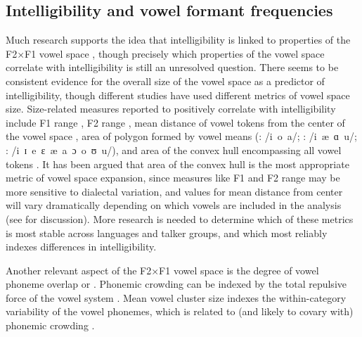 \subsection{Intelligibility and vowel formant frequencies}
Much research supports the idea that intelligibility is linked to properties of the F2×F1 vowel space \citep[e.g.,][]{BondMoore1994, BradlowEtAl1996, HazanMarkham2004, Neel2008, McCloyEtAl2013}, though precisely which properties of the vowel space correlate with intelligibility is still an unresolved question.  There seems to be consistent evidence for the overall size of the vowel space as a predictor of intelligibility, though different studies have used different metrics of vowel space size.  Size-related measures reported to positively correlate with intelligibility include F1 range \citep{BradlowEtAl1996}, F2 range \citep{HazanMarkham2004}, mean distance of vowel tokens from the center of the vowel space \citep{BradlowEtAl1996, McCloyEtAl2013}, area of polygon formed by vowel means (\citealt{BradlowEtAl1996}: /i~o~a/; \citealt{Neel2008}: /i~æ~ɑ~u/;  \citealt{McCloyEtAl2012}: /i~ɪ~e~ɛ~æ~a~ɔ~o~ʊ~u/), and area of the convex hull encompassing all vowel tokens \citep{McCloyEtAl2013}.  It has been argued that area of the convex hull is the most appropriate metric of vowel space expansion, since measures like F1 and F2 range may be more sensitive to dialectal variation, and values for mean distance from center will vary dramatically depending on which vowels are included in the analysis (see \citealt{McCloyEtAl2013} for discussion).  More research is needed to determine which of these metrics is most stable across languages and talker groups, and which most reliably indexes differences in intelligibility.

Another relevant aspect of the F2×F1 vowel space is the degree of vowel phoneme overlap or .  Phonemic crowding can be indexed by the total repulsive force of the vowel system \citep[see][]{McCloyEtAl2013}.  Mean vowel cluster size indexes the within-category variability of the vowel phonemes, which is related to (and likely to covary with) phonemic crowding \citep{McCloyEtAl2013}.  

